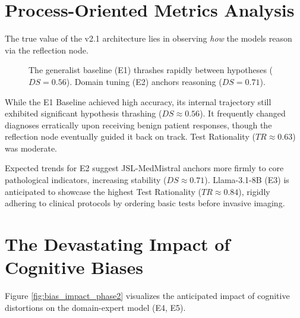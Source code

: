 \documentclass[12pt, a4paper, twoside]{report}
\begin{document}
\section{Process-Oriented Metrics Analysis}
The true value of the v2.1 architecture lies in observing \textit{how} the models reason via the reflection node.

\begin{figure}[htbp]
\centering
{}
\caption{The generalist baseline (E1) thrashes rapidly between hypotheses ($DS=0.56$). Domain tuning (E2) anchors reasoning ($DS=0.71$).}
\label{fig:ds_metric}
\end{figure}

While the E1 Baseline achieved high accuracy, its internal trajectory still exhibited significant hypothesis thrashing ($DS \approx 0.56$). It frequently changed diagnoses erratically upon receiving benign patient responses, though the reflection node eventually guided it back on track. Test Rationality ($TR \approx 0.63$) was moderate. 

Expected trends for E2 suggest JSL-MedMistral anchors more firmly to core pathological indicators, increasing stability ($DS \approx 0.71$). Llama-3.1-8B (E3) is anticipated to showcase the highest Test Rationality ($TR \approx 0.84$), rigidly adhering to clinical protocols by ordering basic tests before invasive imaging.

\section{The Devastating Impact of Cognitive Biases}
Figure \ref{fig:bias_impact_phase2} visualizes the anticipated impact of cognitive distortions on the domain-expert model (E4, E5).
\end{document}
